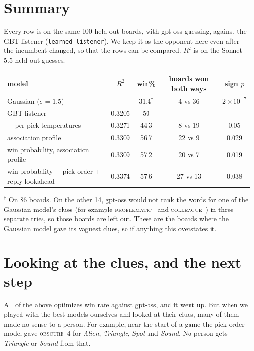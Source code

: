 \documentclass[11pt]{article}
\newcommand{\clue}[2]{\textsc{#1}~#2}
\begin{document}
\section{Summary}
\label{sec:table}

Every row is on the same 100 held-out boards, with gpt-oss guessing, against the
GBT listener (\texttt{learned\_listener}). We keep it as the opponent here even
after the incumbent changed, so that the rows can be compared. $R^2$ is on the
Sonnet 5.5 held-out guesses.

\begin{center}
\small
\begin{tabular}{lcccc}
\toprule
model & $R^2$ & win\% & boards won both ways & sign $p$ \\
\midrule
Gaussian ($\sigma = 1.5$) & -- & 31.4$^\dagger$ & 4 vs 36 & $2 \times 10^{-7}$ \\
GBT listener & 0.3205 & 50 & -- & -- \\
\quad + per-pick temperatures & 0.3271 & 44.3 & 8 vs 19 & 0.05 \\
association profile & 0.3309 & 56.7 & 22 vs 9 & 0.029 \\
win probability, association profile & 0.3309 & 57.2 & 20 vs 7 & 0.019 \\
win probability + pick order + reply lookahead & 0.3374 & 57.6 & 27 vs 13 & 0.038 \\
\bottomrule
\end{tabular}
\end{center}
{\small $^\dagger$ On 86 boards. On the other 14, gpt-oss would not rank the words
for one of the Gaussian model's clues (for example \clue{problematic}{} and
\clue{colleague}{}) in three separate tries, so those boards are left out. These
are the boards where the Gaussian model gave its vaguest clues, so if anything this
overstates it.}

\section{Looking at the clues, and the next step}
\label{sec:next}

All of the above optimizes win rate against gpt-oss, and it went up. But when we
played with the best models ourselves and looked at their clues, many of them made
no sense to a person. For example, near the start of a game the pick-order model
gave \clue{obscure}{4} for \emph{Alien}, \emph{Triangle}, \emph{Spot} and
\emph{Sound}. No person gets \emph{Triangle} or \emph{Sound} from that.
\end{document}
